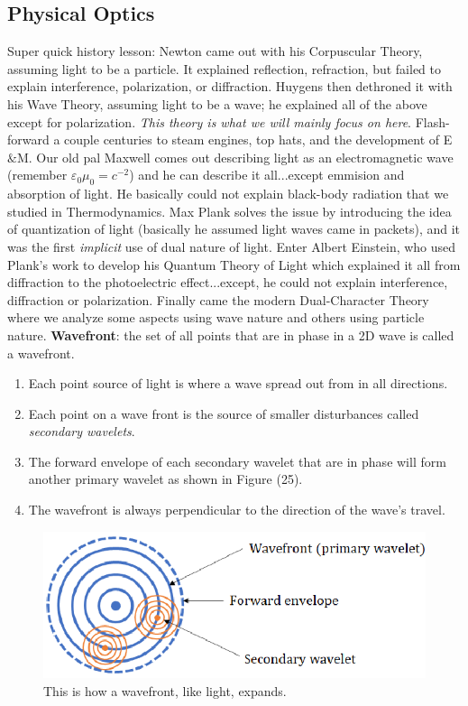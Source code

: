 \documentclass{scrartcl}
\begin{document}
    \subsection{Physical Optics}
    \quad Super quick history lesson: Newton came out with his Corpuscular Theory, assuming light to be a particle. It explained reflection, refraction, but failed to explain interference, polarization, or diffraction. Huygens then dethroned it with his Wave Theory, assuming light to be a wave; he explained all of the above except for polarization. \textit{This theory is what we will mainly focus on here}. Flash-forward a couple centuries to steam engines, top hats, and the development of E$\&$M. Our old pal Maxwell comes out describing light as an electromagnetic wave (remember $\varepsilon_0\mu_0=c^{-2}$) and he can describe it all...except emmision and absorption of light. He basically could not explain black-body radiation that we studied in Thermodynamics. Max Plank solves the issue by introducing the idea of quantization of light (basically he assumed light waves came in packets), and it was the first \textit{implicit} use of dual nature of light. Enter Albert Einstein, who used Plank's work to develop his Quantum Theory of Light which explained it all from diffraction to the photoelectric effect...except, he could not explain interference, diffraction or polarization. Finally came the modern Dual-Character Theory where we analyze some aspects using wave nature and others using particle nature.
    \newline\quad \textbf{Wavefront}: the set of all points that are in phase in a 2D wave is called a wavefront.
    \begin{enumerate}
        \item Each point source of light is where a wave spread out from in all directions.
        \item Each point on a wave front is the source of smaller disturbances called \textit{secondary wavelets}.
        \item The forward envelope of each secondary wavelet that are in phase will form another primary wavelet as shown in Figure (25).
        \item The wavefront is always perpendicular to the direction of the wave's travel.
    \end{enumerate}
    \begin{figure}[H]
        \centering
        \includegraphics[scale=1.5]{wavefront.eps}
        \caption{This is how a wavefront, like light, expands.}
    \end{figure}
\end{document}
